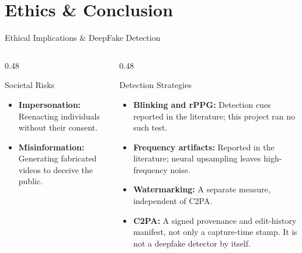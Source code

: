 \section{Ethics \& Conclusion}

\begin{frame}{Ethical Implications \& DeepFake Detection}
    \begin{columns}[T]
        \begin{column}{0.48\textwidth}
            \begin{block}{Societal Risks}
                \small
                \begin{itemize}
                    \item \textbf{Impersonation:} Reenacting individuals without their consent.
                    \item \textbf{Misinformation:} Generating fabricated videos to deceive the public.
                \end{itemize}
            \end{block}
        \end{column}

        \begin{column}{0.48\textwidth}
            \begin{block}{Detection Strategies}
                \small
                \begin{itemize}
                    \item \textbf{Blinking and rPPG:} Detection cues reported in the literature; this project ran no such test.
                    \item \textbf{Frequency artifacts:} Reported in the literature; neural upsampling leaves high-frequency noise.
                    \item \textbf{Watermarking:} A separate measure, independent of C2PA.
                    \item \textbf{C2PA:} A signed provenance and edit-history manifest, not only a capture-time stamp. It is not a deepfake detector by itself.
                \end{itemize}
            \end{block}
        \end{column}
    \end{columns}
\end{frame}

